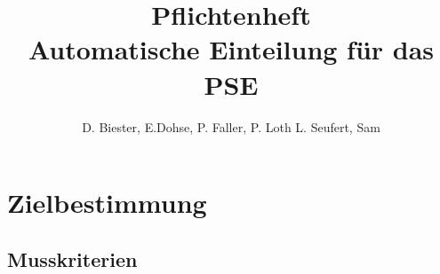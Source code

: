 \documentclass[parskip=full]{scrartcl}
\begin{document}
\title{Pflichtenheft \\
        \large Automatische Einteilung für das PSE}

\author{D. Biester, E.Dohse, P. Faller, P. Loth L. Seufert, Sam}
        
\maketitle
\vfill

\tableofcontents


\section{Zielbestimmung}


\subsection{Musskriterien}
\end{document}

